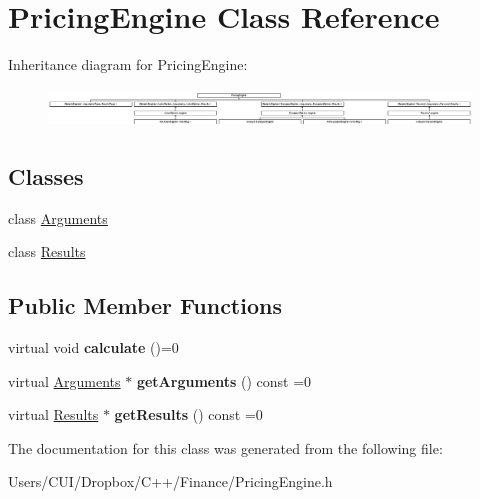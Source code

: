 \hypertarget{class_pricing_engine}{}\section{Pricing\+Engine Class Reference}
\label{class_pricing_engine}
Inheritance diagram for Pricing\+Engine\+:\begin{figure}[H]
\begin{center}
\leavevmode
\includegraphics[height=1.034642cm]{class_pricing_engine}
\end{center}
\end{figure}
\subsection*{Classes}
\begin{DoxyCompactItemize}
\item 
class \hyperlink{class_pricing_engine_1_1_arguments}{Arguments}
\item 
class \hyperlink{class_pricing_engine_1_1_results}{Results}
\end{DoxyCompactItemize}
\subsection*{Public Member Functions}
\begin{DoxyCompactItemize}
\item 
\hypertarget{class_pricing_engine_a733511ffc3cf5e4dc1fbc2a39208d8bd}{}\label{class_pricing_engine_a733511ffc3cf5e4dc1fbc2a39208d8bd} 
virtual void {\bfseries calculate} ()=0
\item 
\hypertarget{class_pricing_engine_a399f4519f58b2ac1d108ce14d0058c97}{}\label{class_pricing_engine_a399f4519f58b2ac1d108ce14d0058c97} 
virtual \hyperlink{class_pricing_engine_1_1_arguments}{Arguments} $\ast$ {\bfseries get\+Arguments} () const =0
\item 
\hypertarget{class_pricing_engine_a73e2852ef4c28e92a402492e86717d0b}{}\label{class_pricing_engine_a73e2852ef4c28e92a402492e86717d0b} 
virtual \hyperlink{class_pricing_engine_1_1_results}{Results} $\ast$ {\bfseries get\+Results} () const =0
\end{DoxyCompactItemize}


The documentation for this class was generated from the following file\+:\begin{DoxyCompactItemize}
\item 
Users/\+C\+U\+I/\+Dropbox/\+C++/\+Finance/Pricing\+Engine.\+h\end{DoxyCompactItemize}
